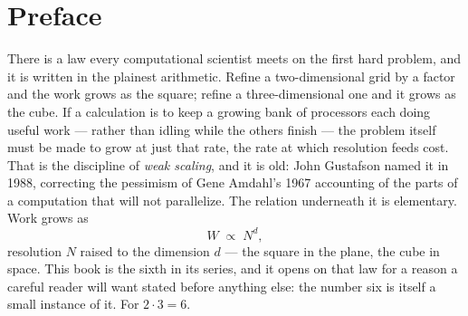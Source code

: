 \chapter*{Preface}

There is a law every computational scientist meets on the first hard problem,
and it is written in the plainest arithmetic. Refine a two-dimensional grid by
a factor and the work grows as the square; refine a three-dimensional one and
it grows as the cube. If a calculation is to keep a growing bank of processors
each doing useful work --- rather than idling while the others finish --- the
problem itself must be made to grow at just that rate, the rate at which
resolution feeds cost. That is the discipline of \emph{weak scaling}, and it is
old: John Gustafson named it in 1988, correcting the pessimism of Gene Amdahl's
1967 accounting of the parts of a computation that will not parallelize. The
relation underneath it is elementary. Work grows as
\[
  W \;\propto\; N^{d},
\]
resolution $N$ raised to the dimension $d$ --- the square in the plane, the cube
in space. This book is the sixth in its series, and it opens on that law for a
reason a careful reader will want stated before anything else: the number six is
itself a small instance of it. For $2 \cdot 3 = 6$.

